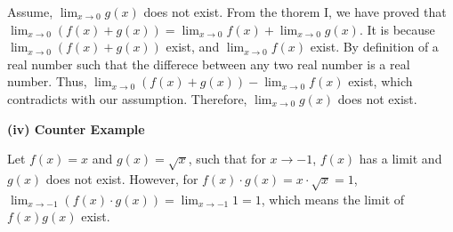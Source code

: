 \documentclass[a4paper,12pt]{report}
\begin{document}
\noindent
Assume, $\displaystyle{\lim_{x\to 0}}g(x)$ does not exist. From the thorem I, we have proved that $\displaystyle{\lim_{x\to 0}}(f(x)+g(x))=\displaystyle{\lim_{x\to 0}}f(x)+\displaystyle{\lim_{x\to 0}}g(x)$. It is because $\displaystyle{\lim_{x\to 0}}(f(x)+g(x))$ exist, and $\displaystyle{\lim_{x\to 0}}f(x)$ exist. By definition of a real number such that the differece between any two real number is a real number. Thus, $\displaystyle{\lim_{x\to 0}}(f(x)+g(x))-\displaystyle{\lim_{x\to 0}}f(x)$ exist, which contradicts with our assumption. Therefore, $\displaystyle{\lim_{x\to 0}}g(x)$ does not exist.

\noindent
\textbf{(iv) Counter Example}

\noindent
Let $f(x)=x$ and $g(x)=\sqrt{x}$, such that for $x\to -1$, $f(x)$ has a limit and $g(x)$ does not exist. However, for $f(x)\cdot{g(x)}=x\cdot{\sqrt{x}}=1$, $\displaystyle{\lim_{x\to -1}}(f(x)\cdot{g(x)})=\displaystyle{\lim_{x\to -1}}1=1$, which means the limit of $f(x)g(x)$ exist.
\end{document}
